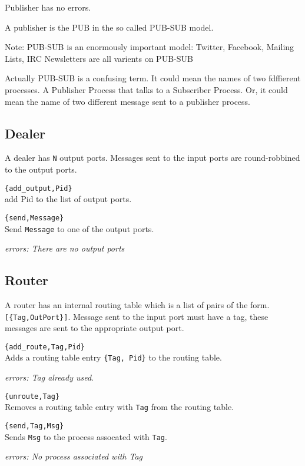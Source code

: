 \documentclass[10pt]{article}
\begin{document}
Publisher has no errors.

A publisher is the PUB in the so called PUB-SUB model.

Note: PUB-SUB is an enormously important model:
Twitter, Facebook,  Mailing Lists, IRC Newsletters are all varients on PUB-SUB

Actually PUB-SUB is a confusing term. It could mean the
names of two fdffierent processes. A Publisher Process that talks to a Subscriber
Process. Or, it could mean the name of two different message sent to a publisher
process. 

\subsection{Dealer}
A dealer has \verb+N+ output ports. 
Messages sent to the input ports are round-robbined to
the output ports.

\begin{description}
\item \verb+{add_output,Pid}+\\
add Pid to the list of output ports.
\item \verb+{send,Message}+\\
  Send \verb+Message+ to one of the output ports.
  
  {\sl errors: There are no output ports}
\end{description}

\subsection{Router}

A router has an internal routing table which is a list of pairs of the form.
\verb+[{Tag,OutPort}]+. Message sent to the input port must have
a tag, these messages are sent to the appropriate output port.


\begin{description}
\item \verb+{add_route,Tag,Pid}+\\
  Adds a routing table entry \verb+{Tag, Pid}+ to the
  routing table. 

  {\sl errors: Tag already used}. 
  
\item \verb+{unroute,Tag}+\\
  Removes a routing table entry with \verb+Tag+ from the routing table.
  
\item \verb+{send,Tag,Msg}+\\
  Sends \verb+Msg+ to the process assocated with \verb+Tag+.
  
  {\sl errors: No process associated with Tag}
  
\end{description}
\end{document}
